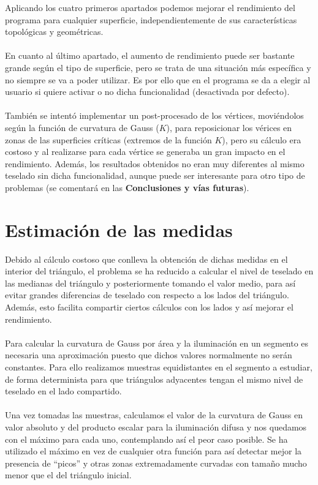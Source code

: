 	Aplicando los cuatro primeros apartados podemos mejorar el rendimiento del programa para cualquier superficie, independientemente de sus características topológicas y geométricas.\\
	\\En cuanto al último apartado, el aumento de rendimiento puede ser bastante grande según el tipo de superficie, pero se trata de una situación más específica y no siempre se va a poder utilizar. Es por ello que en el programa se da a elegir al usuario si quiere activar o no dicha funcionalidad (desactivada por defecto).\\
	\\También se intentó implementar un post-procesado de los vértices, moviéndolos según la función de curvatura de Gauss ($K$), para reposicionar los vérices en zonas de las superficies críticas (extremos de la función $K$), pero su cálculo era costoso y al realizarse para cada vértice se generaba un gran impacto en el rendimiento. Además, los resultados obtenidos no eran muy diferentes al mismo teselado sin dicha funcionalidad, aunque puede ser interesante para otro tipo de problemas (se comentará en las \textbf{Conclusiones y vías futuras}).
	
	
\section{Estimación de las medidas}
	Debido al cálculo costoso que conlleva la obtención de dichas medidas en el interior del triángulo, el problema se ha reducido a calcular el nivel de teselado en las medianas del triángulo y posteriormente tomando el valor medio, para así evitar grandes diferencias de teselado con respecto a los lados del triángulo. Además, esto facilita compartir ciertos cálculos con los lados y así mejorar el rendimiento.\\
	\\Para calcular la curvatura de Gauss por área y la iluminación en un segmento es necesaria una aproximación puesto que dichos valores normalmente no serán constantes. Para ello realizamos muestras equidistantes en el segmento a estudiar, de forma determinista para que triángulos adyacentes tengan el mismo nivel de teselado en el lado compartido.\\
	\\Una vez tomadas las muestras, calculamos el valor de la curvatura de Gauss en valor absoluto y del producto escalar para la iluminación difusa y nos quedamos con el máximo para cada uno, contemplando así el peor caso posible. Se ha utilizado el máximo en vez de cualquier otra función para así detectar mejor la presencia de ``picos'' y otras zonas extremadamente curvadas con tamaño mucho menor que el del triángulo inicial.

\endinput
